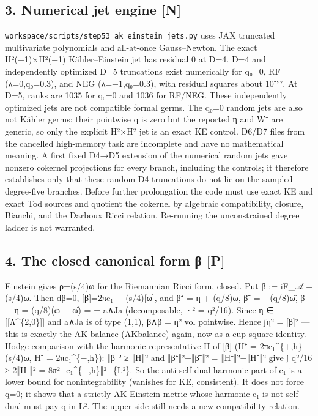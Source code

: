 \documentclass[
  10pt,
]{report}
\begin{document}
\hypertarget{numerical-jet-engine-n}{%
\subsection{3. Numerical jet engine
{[}N{]}}\label{numerical-jet-engine-n}}

\texttt{workspace/scripts/step53\_ak\_einstein\_jets.py} uses JAX
truncated multivariate polynomials and all-at-once Gauss--Newton. The
exact H²(−1)×H²(−1) Kähler--Einstein jet has residual 0 at D=4. D=4 and
independently optimized D=5 truncations exist numerically for q₀=0, RF
(λ=0,q₀=0.3), and NEG (λ=−1,q₀=0.3), with residual squares about 10⁻²⁷.
At D=5, ranks are 1035 for q₀=0 and 1036 for RF/NEG. These independently
optimized jets are not compatible formal germs. The q₀=0 random jets are
also not Kähler germs: their pointwise q is zero but the reported η and
W⁺ are generic, so only the explicit H²×H² jet is an exact KE control.
D6/D7 files from the cancelled high-memory task are incomplete and have
no mathematical meaning. A first fixed D4→D5 extension of the numerical
random jets gave nonzero cokernel projections for every branch,
including the controls; it therefore establishes only that these random
D4 truncations do not lie on the sampled degree-five branches. Before
further prolongation the code must use exact KE and exact Tod sources
and quotient the cokernel by algebraic compatibility, closure, Bianchi,
and the Darboux Ricci relation. Re-running the unconstrained degree
ladder is not warranted.

\hypertarget{the-closed-canonical-form-ux3b2-p}{%
\subsection{4. The closed canonical form β
{[}P{]}}\label{the-closed-canonical-form-ux3b2-p}}

Einstein gives ρ=(s/4)ω for the Riemannian Ricci form, closed. Put β :=
iF\_𝒜 − (s/4)ω. Then dβ=0, {[}β{]}=2πc₁ − (s/4){[}ω{]}, and β⁺ = η +
(q/8)ω, β⁻ = −(q/8)ω̂, β − η = (q/8)(ω − ω̂) = ± a∧Ja (decomposable,
\textbar·\textbar² = q²/16). Since η ∈ {[}{[}Λ\^{}\{2,0\}{]}{]} and a∧Ja
is of type (1,1), β∧β = \textbar η\textbar² vol pointwise. Hence
∫\textbar η\textbar² = {[}β{]}² --- this is exactly the AK balance
(AKbalance) again, now as a cup-square identity. Hodge comparison with
the harmonic representative H of {[}β{]} (H⁺ = 2πc₁\^{}\{+,h\} − (s/4)ω,
H⁻ = 2πc₁\^{}\{−,h\}): ‖β‖² ≥ ‖H‖² and ‖β⁺‖²−‖β⁻‖² = ‖H⁺‖²−‖H⁻‖² give ∫
q²/16 ≥ 2‖H⁻‖² = 8π² ‖c₁\^{}\{−,h\}‖²\_\{L²\}. So the anti-self-dual
harmonic part of c₁ is a lower bound for nonintegrability (vanishes for
KE, consistent). It does not force q=0; it shows that a strictly AK
Einstein metric whose harmonic c₁ is not self-dual must pay q in L². The
upper side still needs a new compatibility relation.
\end{document}
